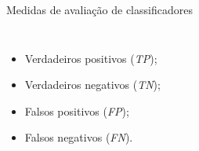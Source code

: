 \documentclass[%
  10pt,%
  aspectratio = 169,%
  compress,%
  t,%
]{beamer}%
\begin{document}
    \begin{frame}[fragile = singleslide]{}{Medidas de avaliação de classificadores}
        \begin{columns}[t]
            \vspace{0.3cm}
            \begin{itemize}
                \item Verdadeiros positivos (\textit{TP});
                
                \item Verdadeiros negativos (\textit{TN});
                
                \item Falsos positivos (\textit{FP});
                
                \item Falsos negativos (\textit{FN}).
            \end{itemize}
            
            
        \end{columns}
    \end{frame}
    
\end{document}
